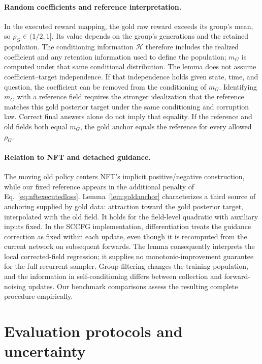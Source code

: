 \documentclass{article}
\begin{document}
\paragraph{Random coefficients and reference interpretation.}
In the executed reward mapping, the gold raw reward exceeds its group's mean, so $\rho_G\in(1/2,1]$. Its value depends on the group's generations and the retained population. The conditioning information $\mathcal H$ therefore includes the realized coefficient and any retention information used to define the population; $m_G$ is computed under that same conditional distribution. The lemma does not assume coefficient--target independence. If that independence holds given state, time, and question, the coefficient can be removed from the conditioning of $m_G$. Identifying $m_G$ with a reference field requires the stronger idealization that the reference matches this gold posterior target under the same conditioning and corruption law. Correct final answers alone do not imply that equality. If the reference and old fields both equal $m_G$, the gold anchor equals the reference for every allowed $\rho_G$.

\paragraph{Relation to NFT and detached guidance.}
The moving old policy centers NFT's implicit positive/negative construction, while our fixed reference appears in the additional penalty of Eq.~\eqref{eq:nftexecutedloss}. Lemma~\ref{lem:goldanchor} characterizes a third source of anchoring supplied by gold data: attraction toward the gold posterior target, interpolated with the old field. It holds for the field-level quadratic with auxiliary inputs fixed. In the SCCFG implementation, differentiation treats the guidance correction as fixed within each update, even though it is recomputed from the current network on subsequent forwards. The lemma consequently interprets the local corrected-field regression; it supplies no monotonic-improvement guarantee for the full recurrent sampler. Group filtering changes the training population, and the information in self-conditioning differs between collection and forward-noising updates. Our benchmark comparisons assess the resulting complete procedure empirically.

\section{Evaluation protocols and uncertainty}
\label{app:experimentdetails}
\end{document}
